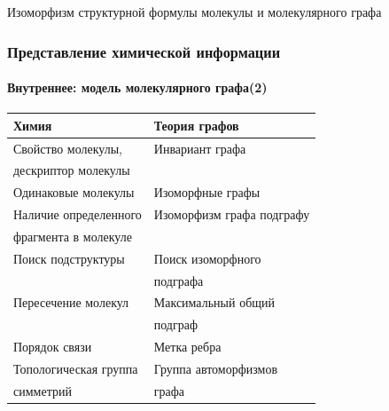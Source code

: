 \begin{frame}
\begin{columns}
\begin{column}{0.2\textwidth}
    \end{column}
   \end{columns}
   Изоморфизм структурной формулы молекулы и молекулярного графа
\end{frame}

\begin{frame}
  \frametitle{Представление химической информации}
  \framesubtitle{Внутреннее: модель молекулярного графа(2)}
  \begin{center}
  \begin{tabular}{|m{5cm}|m{5cm}|}
      \hline Химия & Теория графов \\ \hline
      {\color{magenta}Свойство молекулы,} & {\color{orange}Инвариант графа} \\ 
      {\color{magenta}дескриптор молекулы} & \\ \hline
      {\color{magenta}Одинаковые молекулы} & {\color{orange}Изоморфные графы} \\ \hline
      {\color{magenta}Наличие определенного} & {\color{orange}Изоморфизм графа подграфу}  \\
      {\color{magenta}фрагмента в молекуле} & \\ \hline
      {\color{magenta}Поиск подструктуры} & {\color{orange}Поиск изоморфного} \\ & {\color{orange}подграфа} \\ \hline
      {\color{magenta}Пересечение молекул} & {\color{orange}Максимальный общий} \\ & {\color{orange}подграф} \\ \hline
      {\color{magenta}Порядок связи} & {\color{orange}Метка ребра} \\ \hline
      {\color{magenta}Топологическая группа} & {\color{orange}Группа автоморфизмов} \\ 
      {\color{magenta}симметрий} & {\color{orange}графа} \\ \hline
  \end{tabular} 
\end{center}
\end{frame}

